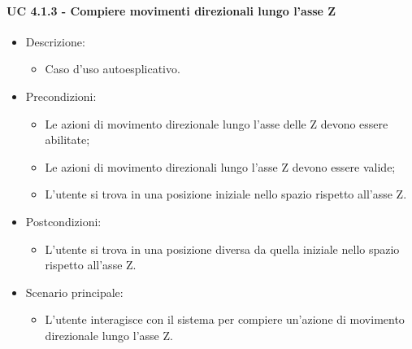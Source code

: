 \paragraph{UC 4.1.3 - Compiere movimenti direzionali lungo l'asse Z}
\begin{itemize}

	\item Descrizione:
	\begin{itemize}
		\item Caso d'uso autoesplicativo.
	\end{itemize}
	
	\item Precondizioni:
	\begin{itemize}
		\item Le azioni di movimento direzionale lungo l'asse delle Z devono essere abilitate;
		\item Le azioni di movimento direzionali lungo l'asse Z devono essere valide;
		\item L'utente si trova in una posizione iniziale nello spazio rispetto all'asse Z.
	\end{itemize}
	
	\item Postcondizioni:
	\begin{itemize}
		\item L'utente si trova in una posizione diversa da quella iniziale nello spazio rispetto all'asse Z.
	\end{itemize}
	
	\item Scenario principale:
	\begin{itemize}
		\item L'utente interagisce con il sistema per compiere un'azione di movimento direzionale lungo l'asse Z.
	\end{itemize}
	
\end{itemize}

